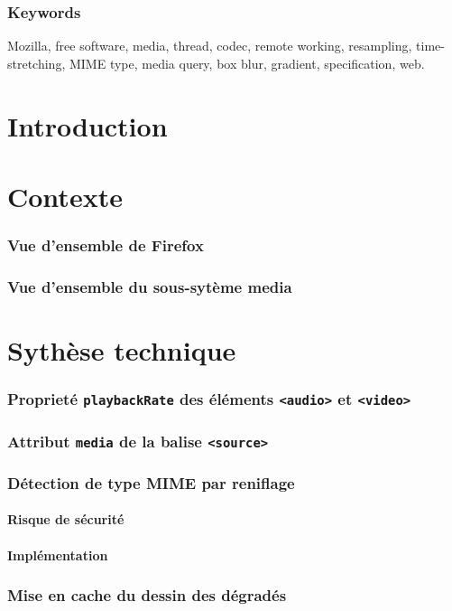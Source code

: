 \documentclass[a4paper,10pt]{article}
\newcommand{\cc}[1]{\texttt{#1}}
\begin{document}
\section*{Keywords}
Mozilla, free software, media, thread, codec, remote working, resampling,
time-stretching, MIME type, media query, box blur, gradient, specification, web.

{\footnotesize
\tableofcontents
}

\clearpage

\begin{multicols}{2}
  \part*{Introduction}
  \part{Contexte}
  \section{Vue d'ensemble de Firefox}
  \section{Vue d'ensemble du sous-sytème media}
  \part{Sythèse technique}
  \section{Proprieté \cc{playbackRate} des éléments \cc{<audio>} et \cc{<video>}}
  \section{Attribut \cc{media} de la balise \cc{<source>}}
  \section{Détection de type MIME par reniflage}
    \subsection{Risque de sécurité}
    \subsection{Implémentation}
  \section{Mise en cache du dessin des dégradés}

\end{multicols}
\end{document}
